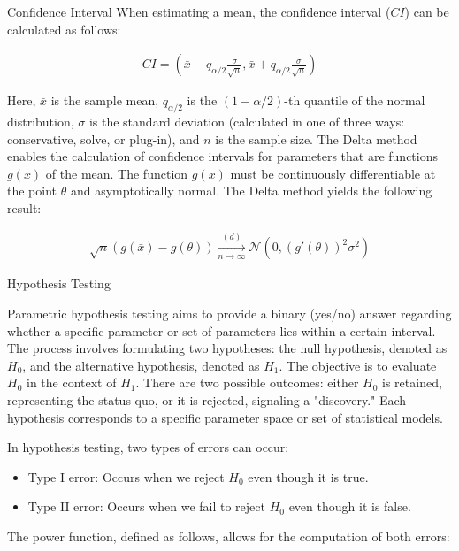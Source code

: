 \documentclass{beamer}
\begin{document}
\begin{frame}
\begin{columns}
\begin{column}{0.3\textwidth}
\begin{block}{Confidence Interval}
When estimating a mean, the confidence interval (\(CI\)) can be calculated as follows:

\begin{align*}
    CI = \left( \bar{x} - q_{\alpha/2} \frac{\sigma}{\sqrt{n}}, \bar{x} + q_{\alpha/2} \frac{\sigma}{\sqrt{n}} \right)
\end{align*}

Here, \(\bar{x}\) is the sample mean, \(q_{\alpha/2}\) is the \((1 - \alpha/2)\)-th quantile of the normal distribution, \(\sigma\) is the standard deviation (calculated in one of three ways: conservative, solve, or plug-in), and \(n\) is the sample size. The Delta method enables the calculation of confidence intervals for parameters that are functions \(g(x)\) of the mean. The function \(g(x)\) must be continuously differentiable at the point \(\theta\) and asymptotically normal. The Delta method yields the following result:

\begin{align*}
    \sqrt{n}(g(\bar{x}) - g(\theta)) \xrightarrow[n \to \infty]{(d)} \mathcal{N}(0, (g'(\theta))^2 \sigma^2)
\end{align*}

\end{block}

\begin{block}{Hypothesis Testing}

Parametric hypothesis testing aims to provide a binary (yes/no) answer regarding whether a specific parameter or set of parameters lies within a certain interval. The process involves formulating two hypotheses: the null hypothesis, denoted as \(H_0\), and the alternative hypothesis, denoted as \(H_1\). The objective is to evaluate \(H_0\) in the context of \(H_1\). There are two possible outcomes: either \(H_0\) is retained, representing the status quo, or it is rejected, signaling a "discovery." Each hypothesis corresponds to a specific parameter space or set of statistical models.

In hypothesis testing, two types of errors can occur:

\begin{itemize}
    \item Type I error: Occurs when we reject \(H_0\) even though it is true.
    \item Type II error: Occurs when we fail to reject \(H_0\) even though it is false.
\end{itemize}

The power function, defined as follows, allows for the computation of both errors:


\end{block}
\end{column}
\end{columns}
\end{frame}
\end{document}

